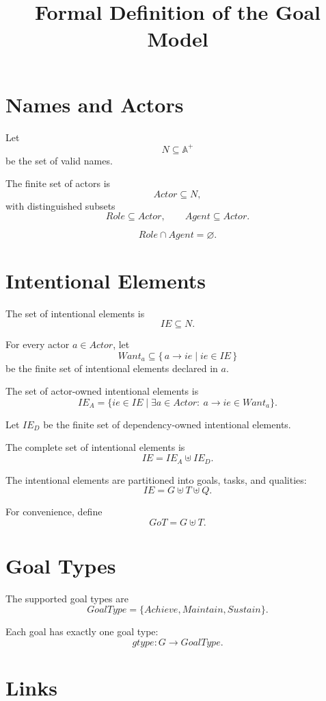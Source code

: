 \documentclass[11pt,a4paper]{article}
\title{Formal Definition of the Goal Model}
\author{}
\date{}
\newcommand{\Names}{\mathit{N}}
\newcommand{\Actor}{\mathit{Actor}}
\newcommand{\Role}{\mathit{Role}}
\newcommand{\Agent}{\mathit{Agent}}
\newcommand{\GoalType}{\mathit{GoalType}}
\newcommand{\gtype}{\mathit{gtype}}
\begin{document}
\maketitle

\section{Names and Actors}

Let
\[
\Names \subseteq \mathbb{A}^{+}
\]
be the set of valid names.

The finite set of actors is
\[
\Actor \subseteq \Names,
\]
with distinguished subsets
\[
\Role \subseteq \Actor,
\qquad
\Agent \subseteq \Actor.
\]

\[
\Role  \cap \Agent = \varnothing.
\]

\section{Intentional Elements}

The set of intentional elements is
\[
IE \subseteq N.
\]

For every actor \(a\in\Actor\), let
\[
Want_a
\subseteq
\{\,a\to ie \mid ie\in IE\,\}
\]
be the finite set of intentional elements declared in \(a\).

The set of actor-owned intentional elements is
\[
IE_A
=
\{
ie\in IE
\mid
\exists a\in\Actor:\ a\to ie\in Want_a
\}.
\]

Let \(IE_D\) be the finite set of dependency-owned intentional elements.

The complete set of intentional elements is
\[
IE
=
IE_A \uplus IE_D.
\]

The intentional elements are partitioned into goals, tasks, and qualities:
\[
IE
=
G \uplus T \uplus Q.
\]

For convenience, define
\[
GoT
=
G \uplus T.
\]
\section{Goal Types}

The supported goal types are
\[
\GoalType
=
\{
\mathit{Achieve},
\mathit{Maintain},
\mathit{Sustain}
\}.
\]

Each goal has exactly one goal type:
\[
\gtype
:
G
\rightarrow
\GoalType.
\]


\section{Links}
\end{document}

